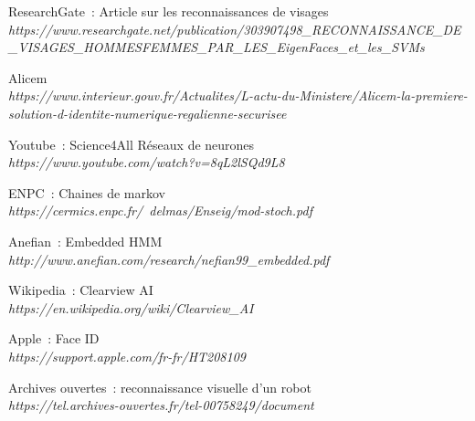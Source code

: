 \documentclass[12pt,french]{article}
\theoremstyle{plain}
\theoremstyle{definition}
\begin{document}
\begin{thebibliography}{18}
\bibitem{}
  ResearchGate~: Article sur les reconnaissances de visages
  \\\textit{https://www.researchgate.net/publication/303907498\_RECONNAISSANCE\_DE\_VISAGES\_HOMMESFEMMES\_PAR\_LES\_EigenFaces\_et\_les\_SVMs}

\bibitem{}
  Alicem
  \\\textit{https://www.interieur.gouv.fr/Actualites/L-actu-du-Ministere/Alicem-la-premiere-solution-d-identite-numerique-regalienne-securisee}

\bibitem{}
  Youtube~: Science4All Réseaux de neurones
  \\\textit{https://www.youtube.com/watch?v=8qL2lSQd9L8}

\bibitem{}
  ENPC~: Chaines de markov
  \\\textit{https://cermics.enpc.fr/~delmas/Enseig/mod-stoch.pdf}

\bibitem{}
  Anefian~: Embedded HMM
  \\\textit{http://www.anefian.com/research/nefian99\_embedded.pdf}

\bibitem{}
  Wikipedia~: Clearview AI
  \\\textit{https://en.wikipedia.org/wiki/Clearview\_AI}

\bibitem{}
  Apple~: Face ID
  \\\textit{https://support.apple.com/fr-fr/HT208109}

\bibitem{}
  Archives ouvertes~: reconnaissance visuelle d'un robot
  \\\textit{https://tel.archives-ouvertes.fr/tel-00758249/document}

\end{thebibliography}
\end{document}
